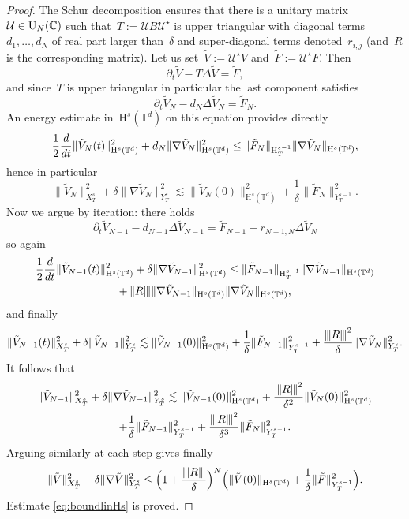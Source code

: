 \documentclass[10pt]{amsart}
\let\Re\relax
\DeclareMathOperator{\Re}{Re}
\theoremstyle{definition}
\newcommand\T{\mathbb{T}}
\renewcommand\H{\mathrm{H}}
\newcommand{\vertiii}[1]{{\vert\kern-0.08em\vert\kern-0.08em\vert #1 \vert\kern-0.08em\vert\kern-0.08em\vert}}
\begin{document}
\begin{proof}

The Schur decomposition ensures that there is a unitary matrix~$\mathcal U\in\textnormal{U}_N(\mathbb{C})$ such that~$T:= \mathcal U B \mathcal U^\star$ is upper triangular with diagonal terms~$d_1,\dots,d_N $ of real part larger than~$ \delta$ and super-diagonal terms denoted~$r_{i,j}$ (and~$R$ is the corresponding matrix).
Let us set~$\tilde V:= \mathcal U^\star V$ and~$\tilde F:= \mathcal U^\star F$. Then
\[
\partial_t \tilde V-T \Delta \tilde V = \tilde F,
\]
and since~$T$ is upper triangular in particular the last component satisfies
\[
\partial_t \tilde V_N -d_N \Delta \tilde V_N = \tilde F_N.
\]
An energy estimate in~$\H^s(\T^d)$ on this equation provides directly
\[
\frac12\frac d {dt}\| \tilde V_N(t)\|_{\H^s(\T^d)}^2+ \Re d_N \|\nabla \tilde V_N\|_{\H^s(\T^d)}^2 \leq \| \tilde F_N\|_{\H_{T}^{s-1}}\|\nabla \tilde V_N\|_{\H^s(\T^d)},
\]
hence
in particular
\[
\| \tilde V_N\|_{X_{T}^s}^2 + \delta \|\nabla \tilde V_N\|_{Y_{T}^s}^2 \lesssim \| \tilde V_N(0)\|^2_{\H^s(\T^d)} + \frac{1}{\delta} \| \tilde F_N\|_{Y_{T}^{s-1}}^2.
\]
Now we argue by iteration: there holds
\[
\partial_t \tilde V_{N-1} -d_{N-1} \Delta \tilde V_{N-1} = \tilde F_{N-1} + r_{N-1,N}\Delta \tilde V_{N }
\]
so
again
\begin{multline*}
\frac12\frac d {dt}\| \tilde V_{N-1}(t)\|_{\H^s(\T^d)}^2 +\delta \|\nabla \tilde V_{N-1}\|_{\H^s(\T^d)}^2 \leq \| \tilde F_{N-1}\|_{\H_{T}^{s-1}}\|\nabla \tilde V_{N-1}\|_{\H^s(\T^d)}\\
+\vertiii{R} \|\nabla \tilde V_{N-1}\|_{\H^s(\T^d)} \|\nabla \tilde V_{N}\|_{\H^s(\T^d)},
\end{multline*}
and finally
\[
\| \tilde V_{N-1}(t)\|_{X_{T}^s}^2 + \delta \| \tilde V_{N-1}\|_{Y_{T}^s}^2 \lesssim \| \tilde V_{N-1}(0)\|^2_{\H^s(\T^d)} + \frac{1}{\delta} \| \tilde F_{N-1}\|_{Y_{T}^{s-1}}^2
+ \frac {\vertiii{R}^2}{\delta} \|\nabla \tilde V_N\|_{Y_{T}^s}^2.
\]
It follows that
\begin{multline*}
\| \tilde V_{N-1}\|_{X_{T}^s}^2 + \delta \| \nabla \tilde V_{N-1}\|_{Y_{T}^s}^2 \lesssim \| \tilde V_{N-1}(0)\|^2_{\H^s(\T^d)} + \frac {\vertiii{R}^2}{\delta^2}\| \tilde V_{N}(0)\|^2_{\H^s(\T^d)} \\
+ \frac{1}{\delta} \| \tilde F_{N-1}\|_{Y_{T}^{s-1}}^2 + \frac {\vertiii{R}^2}{\delta^3}\| \tilde F_{N}\|_{Y_{T}^{s-1}}^2.
\end{multline*}
Arguing similarly at each step gives finally
\[
\| \tilde V \|_{X_{T}^s}^2 +\delta \| \nabla \tilde V \|_{Y_{T}^s}^2 \leq \Bigl(1+ \frac{\vertiii{R} }{\delta}\Bigr)^N\Bigl(\| \tilde V (0)\|_{\H^s(\T^d)} + \frac1\delta \| \tilde F \|_{Y_{T}^{s-1}}^2 \Bigr).
\]
Estimate \eqref{eq:boundlinHs} is proved.
\end{proof}
\end{document}
